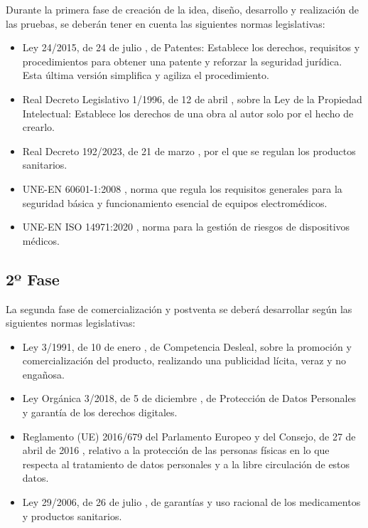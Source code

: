 Durante la primera fase de creación de la idea, diseño, desarrollo y realización de las pruebas, se deberán tener en cuenta las siguientes normas legislativas: 

\begin{itemize}
    \item Ley 24/2015, de 24 de julio \cite{boe--2015-8328}, de Patentes: Establece los derechos, requisitos y procedimientos para obtener una patente y reforzar la seguridad jurídica. Esta última versión simplifica y agiliza el procedimiento.
    \item Real Decreto Legislativo 1/1996, de 12 de abril \cite{boe--1996-8930}, sobre la Ley de la Propiedad Intelectual: Establece los derechos de una obra al autor solo por el hecho de crearlo. 
    \item Real Decreto 192/2023, de 21 de marzo \cite{ministerio_de_sanidad_real_2023}, por el que se regulan los productos sanitarios. 
    \item UNE-EN 60601-1:2008 \cite{UNE2008}, norma que regula los requisitos generales para la seguridad básica y funcionamiento esencial de equipos electromédicos.
    \item UNE-EN ISO 14971:2020 \cite{UNE2020}, norma para la gestión de riesgos de dispositivos médicos.
\end{itemize}


\subsection{2º Fase}
La segunda fase de comercialización y postventa se deberá desarrollar según las siguientes normas legislativas: 
\begin{itemize}
    \item Ley 3/1991, de 10 de enero \cite{boe--1991-628}, de Competencia Desleal, sobre la promoción y comercialización del producto, realizando una publicidad lícita, veraz y no engañosa.
    \item Ley Orgánica 3/2018, de 5 de diciembre \cite{boe--2018-16673}, de Protección de Datos Personales y garantía de los derechos digitales.
    \item Reglamento (UE) 2016/679 del Parlamento Europeo y del Consejo, de 27 de abril de 2016 \cite{boees}, relativo a la protección de las personas físicas en lo que respecta al tratamiento de datos personales y a la libre circulación de estos datos.
    \item Ley 29/2006, de 26 de julio \cite{boe--2006-13554}, de garantías y uso racional de los medicamentos y productos sanitarios.
\end{itemize}